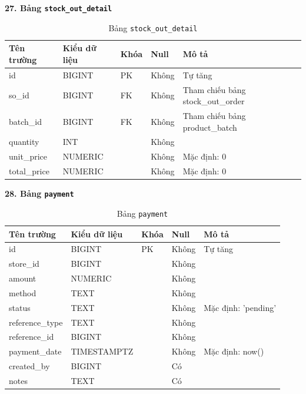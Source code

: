 \documentclass[12pt,a4paper]{report}
\begin{document}
\vspace{0.3cm}
\textbf{27. Bảng \texttt{stock\_out\_detail}}
\vspace{0.1cm}
\begin{longtable}{|>{\ttfamily}p{3.5cm}|p{2.5cm}|p{1.5cm}|p{1.5cm}|p{5cm}|}
\caption{Bảng \texttt{stock\_out\_detail}} \label{tab:db_stock_out_detail} \\
\hline
\normalfont\textbf{Tên trường} & \textbf{Kiểu dữ liệu} & \textbf{Khóa} & \textbf{Null} & \textbf{Mô tả} \\ \hline
id & BIGINT & PK & Không & Tự tăng \\ \hline
so\_id & BIGINT & FK & Không & Tham chiếu bảng stock\_out\_order \\ \hline
batch\_id & BIGINT & FK & Không & Tham chiếu bảng product\_batch \\ \hline
quantity & INT & & Không & \\ \hline
unit\_price & NUMERIC & & Không & Mặc định: 0 \\ \hline
total\_price & NUMERIC & & Không & Mặc định: 0 \\ \hline
\end{longtable}

\vspace{0.3cm}
\textbf{28. Bảng \texttt{payment}}
\vspace{0.1cm}
\begin{longtable}{|>{\ttfamily}p{3.5cm}|p{2.5cm}|p{1.5cm}|p{1.5cm}|p{5cm}|}
\caption{Bảng \texttt{payment}} \label{tab:db_payment} \\
\hline
\normalfont\textbf{Tên trường} & \textbf{Kiểu dữ liệu} & \textbf{Khóa} & \textbf{Null} & \textbf{Mô tả} \\ \hline
id & BIGINT & PK & Không & Tự tăng \\ \hline
store\_id & BIGINT & & Không & \\ \hline
amount & NUMERIC & & Không & \\ \hline
method & TEXT & & Không & \\ \hline
status & TEXT & & Không & Mặc định: 'pending' \\ \hline
reference\_type & TEXT & & Không & \\ \hline
reference\_id & BIGINT & & Không & \\ \hline
payment\_date & TIMESTAMPTZ & & Không & Mặc định: now() \\ \hline
created\_by & BIGINT & & Có & \\ \hline
notes & TEXT & & Có & \\ \hline
\end{longtable}
\end{document}
